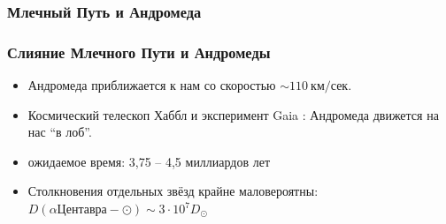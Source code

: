\documentclass[aspectratio=169]{beamer}
\begin{document}
\begin{frame}
\frametitle{Млечный Путь и Андромеда}
\end{frame}

\begin{frame}
\frametitle{Слияние Млечного Пути и Андромеды}
\begin{itemize}
\item Андромеда приближается к нам со скоростью $\sim 110 \: \text{км}/\text{сек}$.
\item Космический телескоп Хаббл \cite{arXiv:1205.6864} и
      эксперимент Gaia \cite{arXiv:1805.04079}:
      Андромеда движется на нас ``в лоб''.
\item ожидаемое время: 3,75 -- 4,5 миллиардов лет
\item Столкновения отдельных звёзд крайне маловероятны:
      $D(\alpha \text{Центавра}- \odot) \sim 3 \cdot 10^7 D_\odot$
\end{itemize}
\end{frame}
\end{document}

